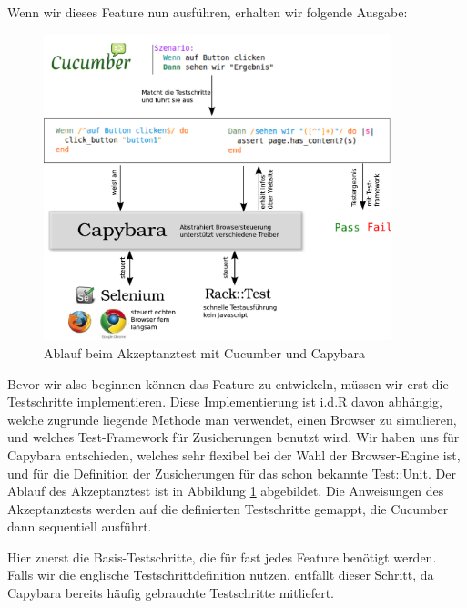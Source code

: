 Wenn wir dieses Feature nun ausführen, erhalten wir folgende Ausgabe:

\begin{figure}[htbp]
 \centering
 \includegraphics[width=0.9\textwidth]{./diagrams/cucumber.pdf}
 \caption{Ablauf beim Akzeptanztest mit Cucumber und Capybara}
 \label{fig:cucumber}
\end{figure}


Bevor wir also beginnen können das Feature zu entwickeln, müssen wir erst die Testschritte implementieren. Diese Implementierung ist i.d.R davon abhängig, welche zugrunde liegende Methode man verwendet, einen Browser zu simulieren, und welches Test-Framework für Zusicherungen benutzt wird. Wir haben uns für Capybara entschieden, welches sehr flexibel bei der Wahl der Browser-Engine ist, und für die Definition der Zusicherungen für das schon bekannte Test::Unit. Der Ablauf des Akzeptanztest ist in Abbildung \ref{fig:cucumber} abgebildet. 
Die Anweisungen des Akzeptanztests werden auf die definierten Testschritte gemappt, die Cucumber dann sequentiell ausführt. 

Hier zuerst die Basis-Testschritte, die für fast jedes Feature benötigt werden. Falls wir die englische Testschrittdefinition nutzen, entfällt dieser Schritt, da Capybara bereits häufig gebrauchte Testschritte mitliefert.

